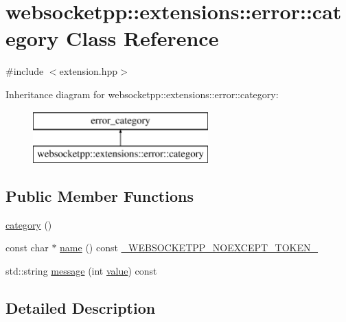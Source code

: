 \hypertarget{classwebsocketpp_1_1extensions_1_1error_1_1category}{}\section{websocketpp\+:\+:extensions\+:\+:error\+:\+:category Class Reference}
\label{classwebsocketpp_1_1extensions_1_1error_1_1category}


{\ttfamily \#include $<$extension.\+hpp$>$}

Inheritance diagram for websocketpp\+:\+:extensions\+:\+:error\+:\+:category\+:\begin{figure}[H]
\begin{center}
\leavevmode
\includegraphics[height=2.000000cm]{classwebsocketpp_1_1extensions_1_1error_1_1category}
\end{center}
\end{figure}
\subsection*{Public Member Functions}
\begin{DoxyCompactItemize}
\item 
\hyperlink{classwebsocketpp_1_1extensions_1_1error_1_1category_a044e36e73724d3245223225994e199dd}{category} ()
\item 
const char $\ast$ \hyperlink{classwebsocketpp_1_1extensions_1_1error_1_1category_a862ad7d1a031d6bcfee5f654425215fd}{name} () const \hyperlink{boost__config_8hpp_aa19747404a5f2fe9c9eb9e9d2e48f26c}{\+\_\+\+W\+E\+B\+S\+O\+C\+K\+E\+T\+P\+P\+\_\+\+N\+O\+E\+X\+C\+E\+P\+T\+\_\+\+T\+O\+K\+E\+N\+\_\+}
\item 
std\+::string \hyperlink{classwebsocketpp_1_1extensions_1_1error_1_1category_a0f7a2dc1baed8fe0ce972bccaef60f12}{message} (int \hyperlink{namespacewebsocketpp_1_1extensions_1_1error_a18c17e561b5a8e2dfc0d98437039f7bf}{value}) const 
\end{DoxyCompactItemize}


\subsection{Detailed Description}


